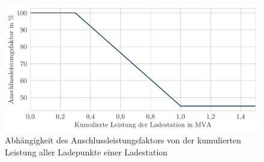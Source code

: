 \begin{figure}[H]
    \centering
    \includegraphics[width=\textwidth]{Bilder/connection_rating_factor}
    \caption{Abhängigkeit des Anschlussleistungsfaktors von der kumulierten Leistung aller Ladepunkte einer Ladestation}\label{fig:connection_rating}
\end{figure}